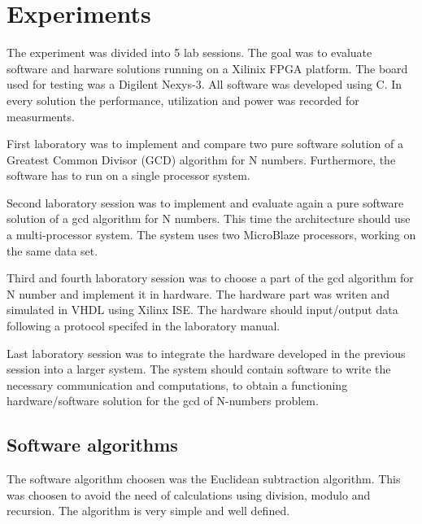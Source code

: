 \documentclass[11pt]{article}
\begin{document}
\section{Experiments}\label{sec:exp}
The experiment was divided into 5 lab sessions. The goal was to evaluate software and harware solutions running on a Xilinix FPGA platform. The board used for testing was a Digilent Nexys-3. All software was developed using C.  
In every solution the performance, utilization and power was recorded for measurments.

First laboratory was to implement and compare two pure software solution of a Greatest Common Divisor (GCD) algorithm for N numbers. Furthermore, the software has to run on a single processor system.

Second laboratory session was to implement and evaluate again a pure software solution of a gcd algorithm for N numbers. This time the architecture should use a multi-processor system. The system uses two MicroBlaze processors, working on the same data set.

Third and fourth  laboratory session was to choose a part of the gcd algorithm for N number and implement it in hardware. The hardware part was writen and simulated in VHDL using Xilinx ISE.  The hardware should input/output data following a protocol specifed in the laboratory manual.

Last laboratory session was to integrate the hardware developed in the previous session into a larger system. The system should contain software to write the necessary communication and computations, to obtain a functioning hardware/software solution for the gcd of N-numbers problem.

\subsection{Software algorithms}
The software algorithm choosen was the Euclidean subtraction algorithm. This was choosen to avoid the need of calculations using division, modulo and recursion. The algorithm is very simple and well defined. 
\end{document}
